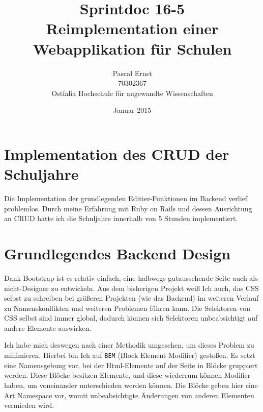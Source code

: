 \documentclass[a4paper,10pt]{scrartcl}
\begin{document}
\title{Sprintdoc 16-5 \\
  Reimplementation einer Webapplikation für Schulen}
\author{Pascal Ernst\\
  70302367 \\
  Ostfalia Hochschule für angewandte Wissenschaften}
\date{Januar 2015}
\maketitle

\newpage

\section{Implementation des CRUD der Schuljahre}

  Die Implementation der grundlegenden Editier-Funktionen im Backend verlief
  problemlos.
  Durch meine Erfahrung mit Ruby on Rails und dessen Ausrichtung an CRUD
  hatte ich die Schuljahre innerhalb von 5 Stunden implementiert.

\section{Grundlegendes Backend Design}

  Dank Bootstrap ist es relativ einfach, eine halbwegs gutaussehende Seite auch
  als nicht-Designer zu entwickeln.
  Aus dem bisherigen Projekt weiß Ich auch, das CSS selbst zu schreiben bei
  größeren Projekten (wie das Backend) im weiteren Verlauf zu Namenskonflikten
  und weiteren Problemen führen kann.
  Die Selektoren von CSS selbst sind immer global, dadurch können sich
  Selektoren unbeabsichtigt auf andere Elemente auswirken.

  Ich habe mich deswegen nach einer Methodik umgesehen, um dieses Problem zu
  minimieren.
  Hierbei bin Ich auf \lstinline{BEM} (Block Element Modifier) gestoßen.
  Es setzt eine Namensgebung vor, bei der Html-Elemente auf der Seite in
  Blöcke gruppiert werden.
  Diese Blöcke besitzen Elemente, und diese wiederrum können Modifier haben,
  um voneinander unterschieden werden können.
  Die Blöcke geben hier eine Art Namespace vor, womit unbeabsichtigte Änderungen
  von anderen Elementen vermieden wird.
\end{document}
